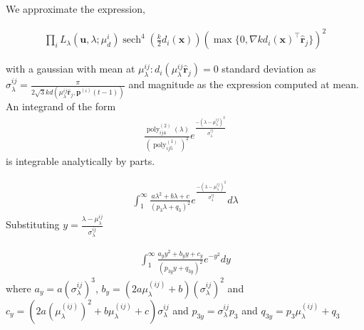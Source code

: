 \documentclass[10pt,twocolumn,letterpaper]{article}
\newcommand{\pos}[2]{\mathbf{p}^{(#1)}(#2)}
\newcommand{\ray}{\hat{\mathbf{r}}_j}
\newcommand{\dishort}{d_i(\mathbf{x})}
\newcommand{\Llambda}{L_{\lambda}(\mathbf{u}, \lambda; \mu^i_d)}
\newcommand{\muijl}{\mu^{(ij)}_{\lambda}}
\newcommand{\sigmaijl}{\sigma^{ij}_{\lambda}}
\DeclareMathOperator{\sech}{sech}
\DeclareMathOperator{\poly}{poly}
\begin{document}
  We approximate the expression,

  \begin{multline}
    \prod_i \Llambda
  \sech^4\left(\frac{k}{2}\dishort\right)(\max\{ 0, \nabla k\dishort^\top\ray \})^2
  \end{multline}

  with a
  gaussian with mean at $\mu^{ij}_{\lambda} : d_i(\mu^{ij}_{\lambda}\ray) = 0$
  standard deviation as $\sigma^{ij}_{\lambda} =
  \frac{\pi}{2\sqrt{3}kd(\mu^{ij}_{\lambda}\ray, \pos{i}{t-1})}$  and magnitude as the
  expression computed at mean. An integrand of the form
  \begin{align}
    \frac{\poly^{(2)}_{ij4}(\lambda)}{(\poly^{(1)}_{ij5})^2}
      e^{\frac{- (\lambda -
  \mu^{ij}_{\lambda})^2}{\sigma^{ij}_{\lambda}}}
  \end{align}
   is integrable analytically by parts.

   \begin{align}
   \int_1^\infty \frac{a\lambda^2 + b\lambda + c}{(p_3\lambda + q_3)^2}e^{\frac{- (\lambda -
  \mu^{ij}_{\lambda})^2}{\sigma^{ij}_{\lambda}}}d\lambda
   \end{align}
   Substituting $y = \frac{\lambda - \mu^{ij}_{\lambda}}{\sigma^{ij}_{\lambda}}$

   \begin{align}
     \int_1^\infty \frac{a_y y^2 + b_yy + c_y}
     {(p_{3y}y + q_{3y})^2}e^{-y^2}dy
   \end{align}
   where $a_y = a(\sigmaijl)^3$, $b_y = (2a\muijl + b)(\sigmaijl)^2$ and $c_y =
   (2a(\muijl)^2 + b\muijl + c)\sigmaijl$ and $p_{3y} = \sigmaijl p_3$ and
   $q_{3y} = p_3\muijl + q_3$
\end{document}
